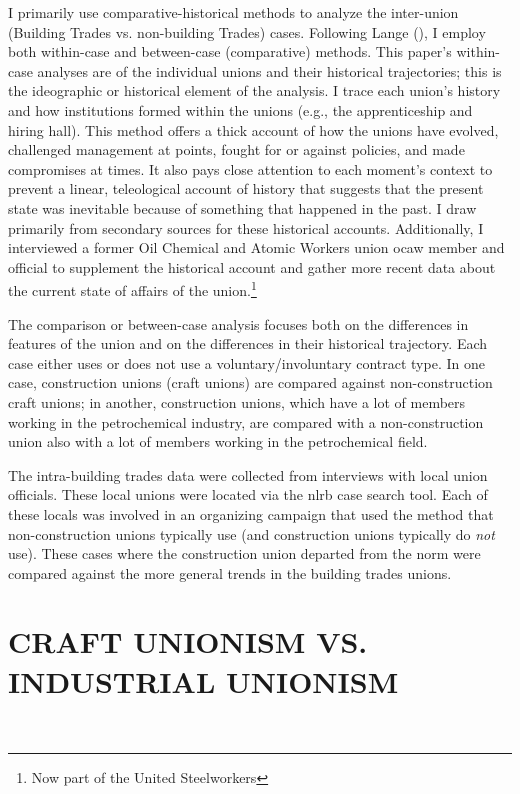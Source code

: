 \documentclass[12pt]{article}
\begin{document}
I primarily use comparative-historical methods to analyze the inter-union (Building Trades vs. non-building Trades) cases. Following Lange (\citeyear{langeComparativeHistoricalMethods2013}), I employ both within-case and between-case (comparative) methods. This paper's within-case analyses are of the individual unions and their historical trajectories; this is the ideographic or historical element of the analysis. I trace each union's history and how institutions formed within the unions (e.g., the apprenticeship and hiring hall). This method offers a thick account of how the unions have evolved, challenged management at points, fought for or against policies, and made compromises at times. It also pays close attention to each moment's context to prevent a linear, teleological account of history that suggests that the present state was inevitable because of something that happened in the past. I draw primarily from secondary sources for these historical accounts. Additionally, I interviewed a former Oil Chemical and Atomic Workers union \acrshort{ocaw} member and official to supplement the historical account and gather more recent data about the current state of affairs of the union.\footnote{Now part of the United Steelworkers}

The comparison or between-case analysis focuses both on the differences in features of the union and on the differences in their historical trajectory. Each case either uses or does not use a voluntary/involuntary contract type. In one case, construction unions (craft unions) are compared against non-construction craft unions; in another, construction unions, which have a lot of members working in the petrochemical industry, are compared with a non-construction union also with a lot of members working in the petrochemical field.

The intra-building trades data were collected from interviews with local union officials. These local unions were located via the \acrfull{nlrb} case search tool. Each of these locals was involved in an organizing campaign that used the method that non-construction unions typically use (and construction unions typically do \textit{not} use). These cases where the construction union departed from the norm were compared against the more general trends in the building trades unions.

\section{CRAFT UNIONISM VS. INDUSTRIAL UNIONISM}\label{sec:craft_vs_industrial} \
\end{document}
